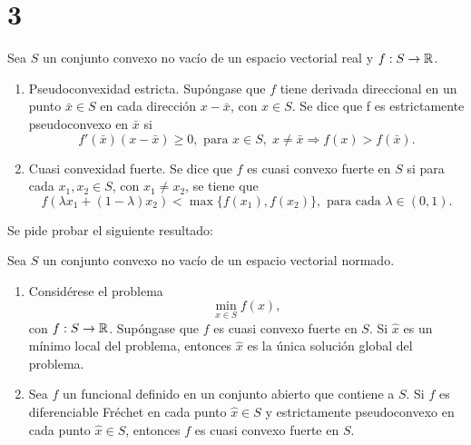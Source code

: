 \section*{3}

\begin{definition}
    Sea $S$ un conjunto convexo no vacío de un espacio vectorial real y $f : S \rightarrow \mathbb{R}$.
    \begin{enumerate}[label=\textup{(\alph*)}]
        \item Pseudoconvexidad estricta.
            \textup{
                Supóngase que $f$ tiene derivada direccional en un punto $\bar{x} \in S$ en cada dirección $x - \bar{x}$,
                con $x \in S$.
                Se dice que f es estrictamente pseudoconvexo en $\bar{x}$ si
                \begin{equation*}
                    f'(\bar{x})(x - \bar{x}) \geq 0, \text{ para } x \in S, \; x \neq \bar{x} \Rightarrow f(x) > f(\bar{x}).
                \end{equation*}
            }
            
            \item Cuasi convexidad fuerte.
                \textup{
                    Se dice que $f$ es cuasi convexo fuerte en $S$ si para cada $x_1 , x_2 \in S$, con $x_1 \neq x_2$,
                    se tiene que
                    \begin{equation*}
                        f(\lambda x_1 + (1 - \lambda) x_2) < \max \{ f(x_1), f(x_2) \}, \text{ para cada } \lambda \in (0, 1).
                    \end{equation*}
                }
    \end{enumerate}
\end{definition}
Se pide probar el siguiente resultado:

\begin{theorem}
    Sea $S$ un conjunto convexo no vacío de un espacio vectorial normado.
    \begin{enumerate}[label=\textup{(\alph*)}]
        \item 
            \textup{
                Considérese el problema
                \begin{equation*}
                    \min_{x \in S} f(x),
                \end{equation*}
                con $f : S \rightarrow \mathbb{R}$.
                Supóngase que $f$ es cuasi convexo fuerte en $S$.
                Si $\hat{x}$ es un mínimo local del problema,
                entonces $\hat{x}$ es la única solución global del problema.
            }
    
        \item 
            \textup{
                Sea $f$ un funcional definido en un conjunto abierto que contiene a $S$.
                Si $f$ es diferenciable Fréchet en cada punto $\hat{x} \in S$ y estrictamente pseudoconvexo en cada punto $\hat{x} \in S$,
                entonces $f$ es cuasi convexo fuerte en $S$.
            }
    \end{enumerate}
\end{theorem}

